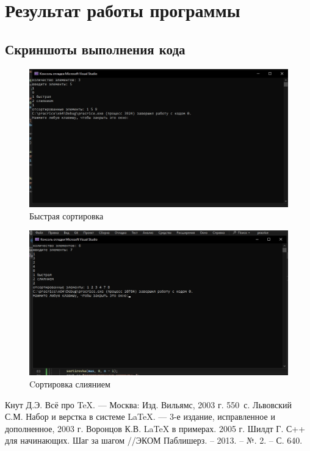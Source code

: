 \documentclass[12pt,a4paper]{scrartcl}
\begin{document}
	\section{Результат работы программы}
	\label{sec:result}
	
	\subsection{Скриншоты выполнения кода}
	\label{sec:result:screen}
	\begin{figure}[h]
	\centering
	\includegraphics[width=1\textwidth]{skrin bis.jpg}
	\caption{Быстрая сортировка}\label{figure1:screen}
	\end{figure}

	\begin{figure}[h]
	\centering
	\includegraphics[width=1\textwidth]{skrin sli.jpg}
	\caption{Cортировка слиянием}\label{figure2:screen}
	\end{figure}

	\begin{thebibliography}{9}
	Кнут Д.Э. Всё про \TeX. \newblock --- Москва: Изд. Вильямс, 2003 г. 550~с.
	Львовский С.М. Набор и верстка в системе \LaTeX{}. \newblock --- 3-е издание, исправленное и дополненное, 2003 г.
	Воронцов К.В. \LaTeX{} в примерах. 2005 г.
	Шилдт Г. С++ для начинающих. Шаг за шагом //ЭКОМ Паблишерз. – 2013. – №. 2. – С. 640.

	\end{thebibliography}
	
\end{document}

